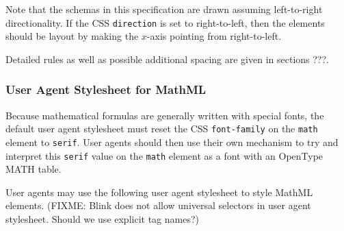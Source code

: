 Note that the schemas in this specification are drawn assuming left-to-right
directionality. If the CSS {\tt direction} is set to right-to-left, then the
elements should be layout by making the $x$-axis pointing from right-to-left.

Detailed rules as well as possible additional spacing are given in sections ???.

\subsubsection{User Agent Stylesheet for MathML}

Because mathematical formulas are generally written with special fonts, the
default user agent stylesheet must reset the CSS {\tt font-family} on the
{\tt math} element to {\tt serif}. User agents should then use their own
mechanism to try and interpret this {\tt serif} value on the {\tt math} element
as a font with an OpenType MATH table.

User agents may use the following user agent stylesheet to style MathML
elements. (FIXME: Blink does not allow universal selectors in user agent
stylesheet. Should we use explicit tag names?)

